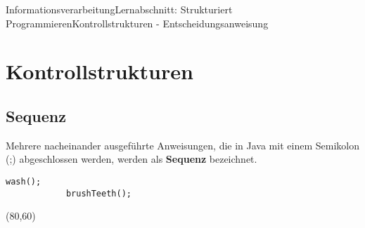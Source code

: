 \documentclass[11pt,oneside,openany,headings=optiontotoc,11pt,numbers=noenddot]{article}
\begin{document}
	\begin{worksheet}{Informationsverarbeitung}{Lernabschnitt: Strukturiert Programmieren}{Kontrollstrukturen - Entscheidungsanweisung}
		\setcounter{section}{5}
		\setcounter{page}{21}
		\section{Kontrollstrukturen}
		\subsection{Sequenz}
		Mehrere nacheinander ausgeführte Anweisungen, die in Java mit einem Semikolon (;) abgeschlossen werden, werden als \textbf{Sequenz} bezeichnet.\\
		\par\noindent
		\begin{minipage}[t]{0.48\textwidth}
			\vspace*{0pt}
			\begin{lstlisting}[style=Python,frame=single]
			wash();
			brushTeeth();
			\end{lstlisting}
		\end{minipage}
		\hfill
		\begin{minipage}[t]{0.48\textwidth}
			\vspace*{0pt}
			\begin{struktogramm}(80,60)
			\end{struktogramm}
		\end{minipage}
		\vspace*{-120pt}

\end{worksheet}
\end{document}
